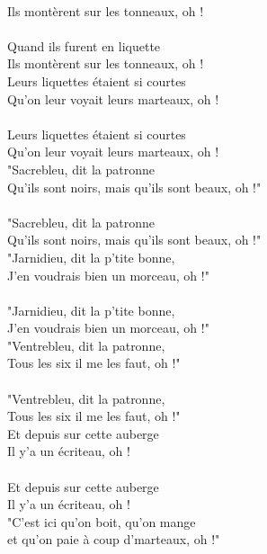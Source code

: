 \\Ils montèrent sur les tonneaux, oh !
\\\\Quand ils furent en liquette
\\Ils montèrent sur les tonneaux, oh !
\\Leurs liquettes étaient si courtes
\\Qu'on leur voyait leurs marteaux, oh !
\\\\Leurs liquettes étaient si courtes
\\Qu'on leur voyait leurs marteaux, oh !
\\"Sacrebleu, dit la patronne
\\Qu'ils sont noirs, mais qu'ils sont beaux, oh !"
\\\\"Sacrebleu, dit la patronne
\\Qu'ils sont noirs, mais qu'ils sont beaux, oh !"
\\"Jarnidieu, dit la p'tite bonne,
\\J'en voudrais bien un morceau, oh !"
\\\\"Jarnidieu, dit la p'tite bonne,
\\J'en voudrais bien un morceau, oh !"
\\"Ventrebleu, dit la patronne,
\\Tous les six il me les faut, oh !"
\\\\"Ventrebleu, dit la patronne,
\\Tous les six il me les faut, oh !"
\\Et depuis sur cette auberge
\\Il y'a un écriteau, oh !
\\\\Et depuis sur cette auberge
\\Il y'a un écriteau, oh !
\\"C'est ici qu'on boit, qu'on mange
\\et qu'on paie à coup d'marteaux, oh !"

\breakpage